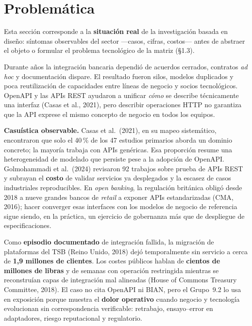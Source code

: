 \section{Problemática}
\label{sec:problematica}

Esta sección corresponde a la \textbf{situación real} de la investigación basada en diseño: síntomas
observables del sector ---casos, cifras, costos--- antes de abstraer el objeto o formular el
problema tecnológico de la matriz (§1.3).

Durante años la integración bancaria dependió de acuerdos cerrados, contratos \textit{ad hoc} y
documentación dispare. El resultado fueron silos, modelos duplicados y poca reutilización de
capacidades entre líneas de negocio y socios tecnológicos. OpenAPI y las APIs REST ayudaron a
unificar \textit{cómo} se describe técnicamente una interfaz (Casas et al., 2021), pero describir
operaciones HTTP no garantiza que la API exprese el mismo concepto de negocio en todos los equipos.

\textbf{Casuística observable.} Casas et al.\ (2021), en su mapeo sistemático, encontraron que solo
el 40\,\% de los 47 estudios primarios aborda un dominio concreto; la mayoría trabaja con APIs
genéricas. Esa proporción resume una heterogeneidad de modelado que persiste pese a la adopción de
OpenAPI. Golmohammadi et al.\ (2024) revisaron 92 trabajos sobre prueba de APIs REST y subrayan el
\textbf{costo} de validar servicios ya desplegados y la escasez de casos industriales
reproducibles. En \textit{open banking}, la regulación británica obligó desde 2018 a nueve grandes
bancos de \textit{retail} a exponer APIs estandarizadas (CMA, 2016); hacer converger esas
interfaces con los modelos de negocio de referencia sigue siendo, en la práctica, un ejercicio de
gobernanza más que de despliegue de especificaciones.

Como \textbf{episodio documentado} de integración fallida, la migración de plataformas del TSB
(Reino Unido, 2018) dejó temporalmente sin servicio a cerca de \textbf{1,9 millones de clientes}.
Los costes públicos hablan de \textbf{cientos de millones de libras} y de semanas con operación
restringida mientras se reconstruían capas de integración mal alineadas (House of Commons Treasury
Committee, 2018). El caso no cita OpenAPI ni BIAN, pero el Grupo~9.2 lo usa en exposición porque
muestra el \textbf{dolor operativo} cuando negocio y tecnología evolucionan sin correspondencia
verificable: retrabajo, ensayo--error en adaptadores, riesgo reputacional y regulatorio.

